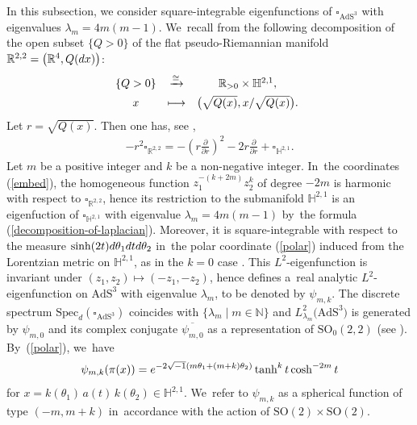 \documentclass[11pt]{article}
\numberwithin{equation}{section}
\numberwithin{equation}{section}
\begin{document}
In this subsection, we consider square-integrable eigenfunctions of
$\square_{\mathrm{AdS}^{3}}$ with eigenvalues $\lambda_{m}=4m(m-1)$. We~recall from \cite[Section~9]{KaKob16} the following decomposition of the open subset $\{Q > 0\}$ of
the flat pseudo-Riemannian manifold $\mathbb{R}^{2,2}=\big(\mathbb{R}^{4},Q({\rm d}x)\big)$:
\begin{align*}
\begin{array}{@{}ccc}
\{Q > 0\} & \xrightarrow{\cong} & \mathbb{R}_{>0} \times \mathbb{H}^{2,1}, \\[1ex]
x & \longmapsto & \big(\sqrt{Q(x)}, x/\sqrt{Q(x)}\big).
\end{array}
\end{align*}
Let $r=\sqrt{Q(x)}$. Then one has, see \cite[p.~215]{KaKob16},
\begin{align}
\label{decomposition-of-laplacian}
-r^2\square_{\mathbb{R}^{2,2}} = -\left(r\frac{\partial}{\partial r}\right)^2 - 2r\frac{\partial}{\partial r} + \square_{\mathbb{H}^{2,1}}.
\end{align}
Let $m$ be a positive integer and $k$ be a non-negative integer. In~the coordinates (\ref{embed}),
the homogeneous function $z_{1}^{-(k+2m)}z_{2}^{k}$ of degree $-2m$
 is harmonic with respect to $\square_{\mathbb{R}^{2,2}}$,
hence its restriction to the submanifold $\mathbb{H}^{2,1}$ is
an eigenfuction of $\square_{\mathbb{H}^{2,1}}$ with eigenvalue $\lambda_{m}=4m(m-1)$
by~the formula (\ref{decomposition-of-laplacian}).
Moreover, it is square-integrable with respect to the measure
$\sinh(2t){\rm d}\theta_{1}{\rm d}t{\rm d}\theta_{2}$ in~the polar coordinate (\ref{polar})
induced from the Lorentzian metric on $\mathbb{H}^{2,1}$,
as in the $k=0$ case \cite[Section~9]{KaKob16}.
This $L^{2}$-eigenfunction is invariant under $(z_{1},z_{2})\mapsto(-z_{1},-z_{2})$,
hence defines a~real analytic $L^{2}$-eigenfunction on $\mathrm{AdS}^{3}$
with eigenvalue $\lambda_{m}$, to be denoted by $\psi_{m,k}$.
The discrete spectrum
$\mathrm{Spec}_{d}(\square_{\mathrm{AdS}^{3}})$ coincides with
$\{\lambda_{m} \mid m \in \mathbb{N}\}$
and $L^{2}_{\lambda_{m}}\big(\mathrm{AdS}^{3}\big)$ is generated by
$\psi_{m,0}$ and its complex conjugate $\overline{\psi_{m,0}}$
as a representation of $\mathrm{SO}_{0}(2,2)$ (see \cite[Claim~9.12]{KaKob16}).
By~(\ref{polar}), we~have
\begin{align}
\label{polarFJ}
\psi_{m,k}(\pi(x))
= {\rm e}^{-2\sqrt{-1}(m\theta_1 + (m+k)\theta_2)}\tanh^{k}t\cosh^{-2m}t
\end{align}
for $x=k(\theta_1)\,a(t)\,k(\theta_2)\in\mathbb{H}^{2,1}$. We~refer to $\psi_{m,k}$ as a spherical function of type $(-m,m+k)$
in~accordance with the action of
$\mathrm{SO}(2)\times\mathrm{SO}(2)$.
\end{document}
